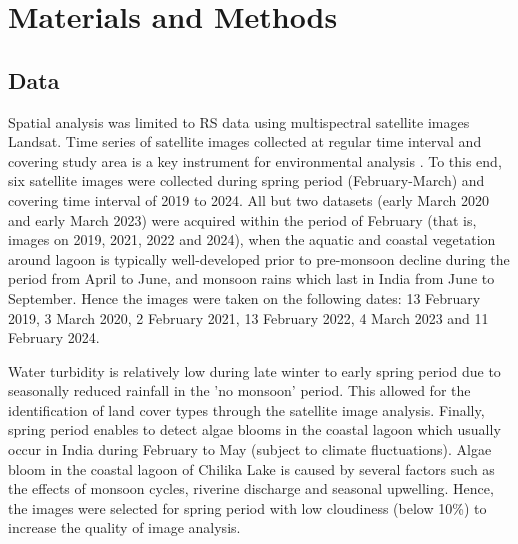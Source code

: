 \documentclass[jmse,article,submit,pdftex,moreauthors]{Definitions/mdpi}
\begin{document}
\section{Materials and Methods}

\subsection{Data}

Spatial analysis was limited to RS data using multispectral satellite images Landsat. Time series of satellite images collected at regular time interval and covering study area is a key instrument for environmental analysis \cite{Lemenkova202324}. To this end, six satellite images were collected during spring period (February-March) and covering time interval of 2019 to 2024. All but two datasets (early March 2020 and early March 2023) were acquired within the period of February (that is, images on 2019, 2021, 2022 and 2024), when the aquatic and coastal vegetation around lagoon is typically well-developed prior to pre-monsoon decline during the period from April to June, and monsoon rains which last in India from June to September. Hence the images were taken on the following dates: 13 February 2019, 3 March 2020, 2 February 2021, 13 February 2022, 4 March 2023 and 11 February 2024. 

Water turbidity is relatively low during late winter to early spring period due to seasonally reduced rainfall in the 'no monsoon' period. This allowed for the identification of land cover types through the satellite image analysis. Finally, spring period enables to detect algae blooms in the coastal lagoon which usually occur in India during February to May (subject to climate fluctuations). Algae bloom in the coastal lagoon of Chilika Lake is caused by several factors such as the effects of monsoon cycles, riverine discharge and seasonal upwelling. Hence, the images were selected for spring period with low cloudiness (below 10\%) to increase the quality of image analysis. 
\end{document}
